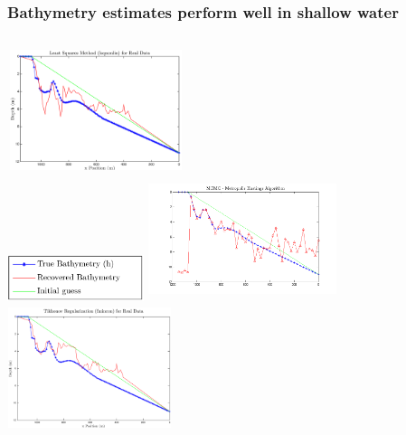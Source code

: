 \documentclass[7pt]{beamer}
\begin{document}
\begin{frame}
	\frametitle{Bathymetry estimates perform well in shallow water}
	   \begin{columns}[t]
        \centering
        \includegraphics[width=5.2cm,height=3.5cm]{img/lsqnonlin_real_data_oct09}\\
        \includegraphics[width=4.0cm,height=1.5cm]{img/legend_simulated.png}
        \centering
       \includegraphics[width=5.5cm,height=3.8cm]{img/MCMC-manufactured_new.png}\\
       \includegraphics[width=4.8cm,height=3.5cm]{img/fmincon_real_data_oct09.png}
      \end{columns}
\end{frame}
\end{document}
